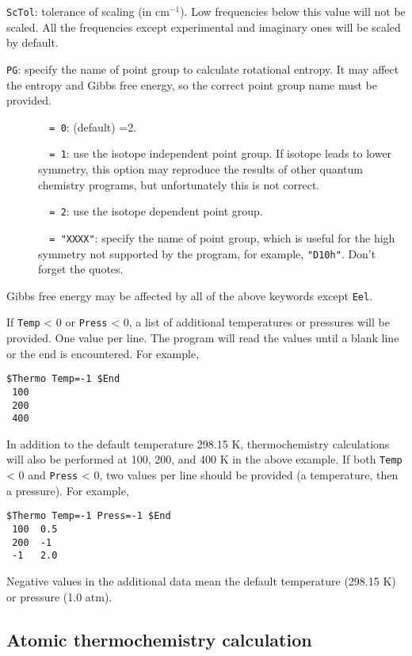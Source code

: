 \documentclass[12pt,english]{extarticle}
\begin{document}
\bigskip{}
\verb|ScTol|: tolerance of scaling (in cm$^{-1}$). Low frequencies below this value will not be scaled. All the frequencies except experimental and imaginary ones will be scaled by default.

\bigskip{}
\verb|PG|: specify the name of point group to calculate rotational
entropy. It may affect the entropy and Gibbs free energy, so the correct point group
name must be provided.
\begin{description}
\item[ ]\verb|  = 0|: (default) =2.
\item[ ]\verb|  = 1|: use the isotope independent point group. If isotope leads to lower symmetry, this option may
reproduce the results of other quantum chemistry programs, but unfortunately this is
not correct.
\item[ ]\verb|  = 2|: use the isotope dependent point group.
\item[ ]\verb|  = "XXXX"|: specify the name of point group, which is useful for the high symmetry not supported by the program, for example, \verb|"D10h"|. Don't forget the quotes.
\end{description}

Gibbs free energy may be affected by all of the above keywords except \verb|Eel|.

If \verb|Temp| < 0 or \verb|Press| < 0, a list of additional temperatures or pressures will be provided. One value per line. The program will
read the values until a blank line or the end is encountered.
For example,
\begin{Verbatim}[frame=single]
 $Thermo Temp=-1 $End
 100
 200
 400
\end{Verbatim}
In addition to the default temperature 298.15 K, thermochemistry calculations will also be performed at 100, 200, and 400 K in the above example. If both \verb|Temp| < 0 and \verb|Press| < 0, two values per line should be provided (a temperature, then a pressure). For example,
\begin{Verbatim}[frame=single]
 $Thermo Temp=-1 Press=-1 $End
 100  0.5
 200  -1
 -1   2.0
\end{Verbatim}
Negative values in the additional data mean the default temperature (298.15 K) or pressure (1.0 atm).

\subsection{Atomic thermochemistry calculation} \label{sec:inp-atom}
\end{document}
